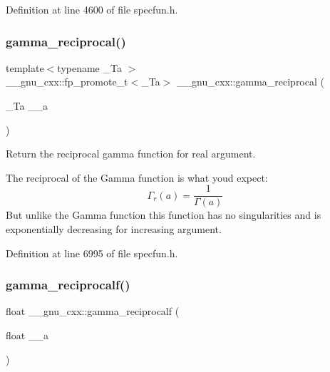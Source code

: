 Definition at line 4600 of file specfun.\+h.

\mbox{\label{group__gnu__math__spec__func_ga641f9bcdb8fc32a9a0ce7a15b5040076}} 
\subsubsection{\texorpdfstring{gamma\+\_\+reciprocal()}{gamma\_reciprocal()}}
{\footnotesize\ttfamily template$<$typename \+\_\+\+Ta $>$ \\
\+\_\+\+\_\+gnu\+\_\+cxx\+::fp\+\_\+promote\+\_\+t$<$\+\_\+\+Ta$>$ \+\_\+\+\_\+gnu\+\_\+cxx\+::gamma\+\_\+reciprocal (\begin{DoxyParamCaption}\item[{\+\_\+\+Ta}]{\+\_\+\+\_\+a }\end{DoxyParamCaption})\hspace{0.3cm}{\ttfamily [inline]}}

Return the reciprocal gamma function for real argument.

The reciprocal of the Gamma function is what you\textquotesingle{}d expect\+: \[ \Gamma_r(a) = \frac{1}{\Gamma(a)} \] But unlike the Gamma function this function has no singularities and is exponentially decreasing for increasing argument. 

Definition at line 6995 of file specfun.\+h.

\mbox{\label{group__gnu__math__spec__func_ga10cccd5045490ac24590c094c43107d8}} 
\subsubsection{\texorpdfstring{gamma\+\_\+reciprocalf()}{gamma\_reciprocalf()}}
{\footnotesize\ttfamily float \+\_\+\+\_\+gnu\+\_\+cxx\+::gamma\+\_\+reciprocalf (\begin{DoxyParamCaption}\item[{float}]{\+\_\+\+\_\+a }\end{DoxyParamCaption})\hspace{0.3cm}{\ttfamily [inline]}}

